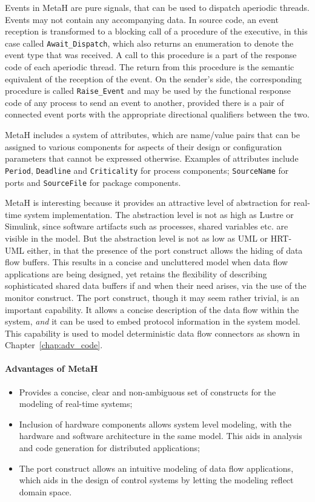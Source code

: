 Events in MetaH are pure signals, that can be used to dispatch
aperiodic threads. Events may not contain any accompanying data. In
source code, an event reception is transformed to a blocking call of a
procedure of the executive, in this case called
\texttt{Await\_Dispatch}, which also returns an enumeration to denote
the event type that was received. A call to this procedure is a part
of the response code of each aperiodic thread. The return from this
procedure is the semantic equivalent of the reception of the event. On
the sender's side, the corresponding procedure is called
\texttt{Raise\_Event} and may be used by the functional response code
of any process to send an event to another, provided there is a pair
of connected event ports with the appropriate directional qualifiers
between the two.

MetaH includes a system of attributes, which are name/value pairs that
can be assigned to various components for aspects of their design or
configuration parameters that cannot be expressed otherwise. Examples
of attributes include \texttt{Period}, \texttt{Deadline} and
\texttt{Criticality} for process components; \texttt{SourceName} for
ports and \texttt{SourceFile} for package components.

MetaH is interesting because it provides an attractive level of
abstraction for real-time system implementation. The abstraction level
is not as high as Lustre or Simulink, since software artifacts such as
processes, shared variables etc. are visible in the model. But the
abstraction level is not as low as UML or HRT-UML either, in that the
presence of the port construct allows the hiding of data flow
buffers. This results in a concise and uncluttered model when data
flow applications are being designed, yet retains the flexibility of
describing sophisticated shared data buffers if and when their need
arises, via the use of the monitor construct. The port construct,
though it may seem rather trivial, is an important capability. It
allows a concise description of the data flow within the system,
\emph{and} it can be used to embed protocol information in the system
model. This capability is used to model deterministic data flow
connectors as shown in Chapter~\ref{chap:adv_code}.

\paragraph{Advantages of MetaH}
\begin{itemize}
\item{Provides a concise, clear and non-ambiguous set of constructs
  for the modeling of real-time systems;}
\item{Inclusion of hardware components allows system level modeling,
  with the hardware and software architecture in the same model. This
  aids in analysis and code generation for distributed applications;}
\item{The port construct allows an intuitive modeling of data flow
  applications, which aids in the design of control systems by letting
  the modeling reflect domain space.}
\end{itemize}

